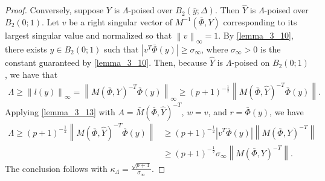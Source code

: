 \documentclass{article}
\begin{document}
\begin{proof}
Conversely, suppose $Y$ is $\Lambda$-poised over $B_2(\bar{y};\Delta)$.  Then $\hat{Y}$ is $\Lambda$-poised over $B_2(0;1)$.    Let $v$ be a right singular vector of $M^{-1}\left(\bar \Phi, Y\right)$ 
corresponding to its largest singular value and normalized so that $\left\|v\right\|_{\infty} = 1$.    By \cref{lemma_3_10},  there exists $y \in B_2\left(0; 1\right)$ such that
$\left| v^T \bar {\Phi}(y) \right| \ge {\sigma_{\infty}}$, where $\sigma_{\infty} > 0$ is the constant guaranteed by \cref{lemma_3_10}.
Then, because $\hat Y$ is $\Lambda$-poised on $B_2(0; 1)$, we have that 
\begin{align*}
\Lambda 
\ge \left\|l(y)\right\|_{\infty} 
= \left\|M\left(\bar \Phi, Y\right)^{-T} \bar \Phi(y)\right\|_{\infty}
\ge \left(p+1\right)^{-\frac1 2 }\left\|M\left(\bar \Phi, \hat Y\right)^{-T} \bar{\Phi}(y)\right\|.
\end{align*}
Applying \cref{lemma_3_13} with $A = {\bar M}\left(\bar \Phi, \hat Y\right)^{-T}$, $w = v$, and $r = \bar \Phi(y)$, we have
\begin{align*}
\Lambda 
\ge \left(p+1\right)^{-\frac1 2 }\left\|M\left(\bar \Phi, \hat Y\right)^{-T} \bar{\Phi}(y)\right\|
&\ge \left(p+1\right)^{-\frac1 2 }|v^T \bar \Phi(y)| \left\|M\left(\bar \Phi, Y\right)^{-T}\right\| \\
&\ge \left(p+1\right)^{-\frac1 2 }\sigma_{\infty} \left\|M\left(\bar \Phi, Y\right)^{-T}\right\|.
\end{align*}
The conclusion follows with $\kappa_{\Lambda} = \frac {\sqrt{p+1}}{\sigma_{\infty}}$.
\end{proof}
\end{document}
